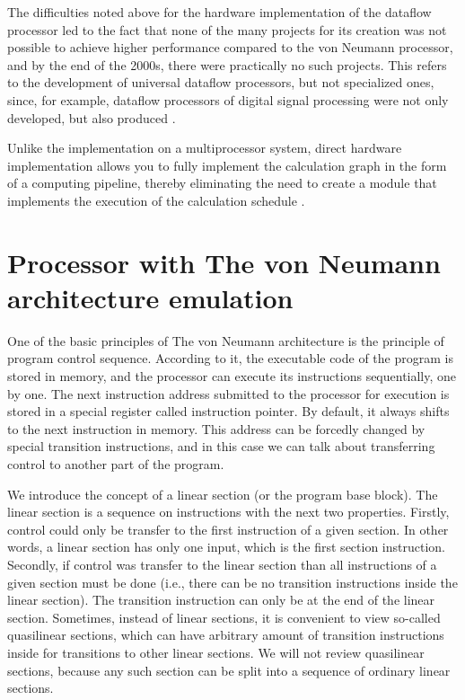 \documentclass[
11pt,%
tightenlines,%
twoside,%
onecolumn,%
nofloats,%
nobibnotes,%
nofootinbib,%
superscriptaddress,%
noshowpacs,%
centertags]%
{revtex4}
\begin{document}
The difficulties noted above for the hardware implementation of the dataflow processor led to the fact that none of the many projects for its creation was not possible to achieve higher performance compared to the von Neumann processor, and by the end of the 2000s, there were practically no such projects. This refers to the development of universal dataflow processors, but not specialized ones, since, for example, dataflow processors of digital signal processing were not only developed, but also produced \cite{terada}.

Unlike the implementation on a multiprocessor system, direct hardware implementation allows you to fully implement the calculation graph in the form of a computing pipeline, thereby eliminating the need to create a module that implements the execution of the calculation schedule \cite{popov}.

\section{Processor with The von Neumann architecture emulation}

One of the basic principles of The von Neumann architecture is the principle of program control sequence. According to it, the executable code of the program is stored in memory, and the processor can execute its instructions sequentially, one by one. The next instruction address submitted to the processor for execution is stored in a special register called instruction pointer. By default, it always shifts to the next instruction in memory. This address can be forcedly changed by special transition instructions, and in this case we can talk about transferring control to another part of the program.

We introduce the concept of a linear section (or the program base block). The linear section is a sequence on instructions with the next two properties. Firstly, control could only be transfer to the first instruction of a given section. In other words, a linear section has only one input, which is the first section instruction. Secondly, if control was transfer to the linear section than all instructions of a given section must be done (i.e., there can be no transition instructions inside the linear section). The transition instruction can only be at the end of the linear section. Sometimes, instead of linear sections, it is convenient to view so-called quasilinear sections, which can have arbitrary amount of transition instructions inside for transitions to other linear sections. We will not review quasilinear sections, because any such section can be split into a sequence of ordinary linear sections.
\end{document}
